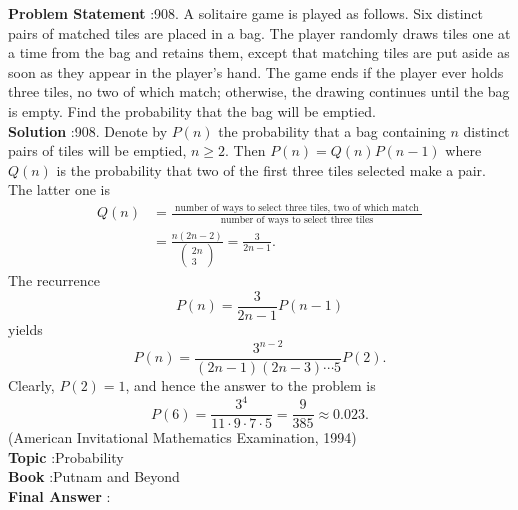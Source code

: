 \documentclass[10pt]{article}
\begin{document}
\textbf{Problem Statement} :908. A solitaire game is played as follows. Six distinct pairs of matched tiles are placed in a bag. The player randomly draws tiles one at a time from the bag and retains them, except that matching tiles are put aside as soon as they appear in the player's hand. The game ends if the player ever holds three tiles, no two of which match; otherwise, the drawing continues until the bag is empty. Find the probability that the bag will be emptied.\\
\textbf{Solution} :908. Denote by $P(n)$ the probability that a bag containing $n$ distinct pairs of tiles will be emptied, $n \geq 2$. Then $P(n)=Q(n) P(n-1)$ where $Q(n)$ is the probability that two of the first three tiles selected make a pair. The latter one is$$ \begin{aligned} Q(n) &=\frac{\text { number of ways to select three tiles, two of which match }}{\text { number of ways to select three tiles }} \\ &=\frac{n(2 n-2)}{\left(\begin{array}{c} 2 n \\ 3 \end{array}\right)}=\frac{3}{2 n-1} . \end{aligned} $$The recurrence$$ P(n)=\frac{3}{2 n-1} P(n-1) $$yields$$ P(n)=\frac{3^{n-2}}{(2 n-1)(2 n-3) \cdots 5} P(2) . $$Clearly, $P(2)=1$, and hence the answer to the problem is$$ P(6)=\frac{3^{4}}{11 \cdot 9 \cdot 7 \cdot 5}=\frac{9}{385} \approx 0.023 . $$(American Invitational Mathematics Examination, 1994)\\
\textbf{Topic} :Probability\\
\textbf{Book} :Putnam and Beyond\\
\textbf{Final Answer} :\\
\end{document}
